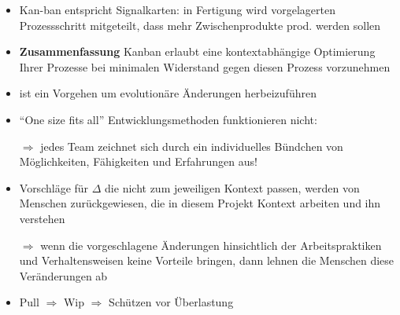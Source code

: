 \begin{itemize}
  \item Kan-ban entspricht Signalkarten: in Fertigung wird vorgelagerten Prozessschritt mitgeteilt,
    dass mehr Zwischenprodukte prod. werden sollen
  \item \textbf{Zusammenfassung} Kanban erlaubt eine kontextabhängige Optimierung Ihrer Prozesse bei
    minimalen Widerstand gegen diesen Prozess vorzunehmen
  \item ist ein Vorgehen um evolutionäre Änderungen herbeizuführen
  \item \enquote{One size fits all} Entwicklungsmethoden funktionieren nicht:
    $\Rightarrow$ jedes Team zeichnet sich durch ein individuelles Bündchen von Möglichkeiten, Fähigkeiten und
    Erfahrungen aus!
  \item Vorschläge für $\Delta$ die nicht zum jeweiligen Kontext passen, werden von Menschen
    zurückgewiesen, die in diesem Projekt Kontext arbeiten und ihn verstehen

    $\Rightarrow$  wenn die vorgeschlagene Änderungen hinsichtlich der Arbeitspraktiken und
    Verhaltensweisen keine Vorteile bringen, dann lehnen die Menschen diese Veränderungen ab
  \item Pull $\Rightarrow$ Wip $\Rightarrow$ Schützen vor Überlastung
\end{itemize}


